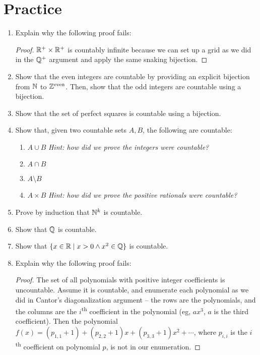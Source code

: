 \documentclass[main.tex]{subfiles}
\begin{document}
\section{Practice}

\begin{enumerate}
	\item
	Explain why the following proof fails:
	\begin{proof}
		\(\mathbb{R}^{+} \times \mathbb{R}^{+}\) is countably infinite because we can set up a grid as we did in the \(\mathbb{Q}^{+}\) argument and apply the same snaking bijection. \mbox{}
	\end{proof}
	\item
	Show that the even integers are countable by providing an explicit bijection from \(\mathbb{N}\) to \(\mathbb{Z}^{\text{even}}\).
	Then, show that the odd integers are countable using a bijection.
	\item
	Show that the set of perfect squares is countable using a bijection.
	\item
	Show that, given two countable sets \(A,B\), the following are countable:
	\begin{enumerate}
		\item \(A \cup B\) \textit{Hint: how did we prove the integers were countable?}
		\item \(A \cap B\)
		\item \(A \setminus B\)
		\item \(A \times B\) \textit{Hint: how did we prove the positive rationals were countable?}
	\end{enumerate}
	\item
	Prove by induction that \(\mathbb{N}^k\) is countable.
	\item Show that \(\mathbb{Q}\) is countable.
	\item Show that \(\{ x \in \mathbb{R} \mid x > 0 \land x^2 \in \mathbb{Q} \}\) is countable.
	\item Explain why the following proof fails:
	\begin{proof}
		The set of all polynomials with positive integer coefficients is uncountable. Assume it is countable, and enumerate each polynomial as we did in Cantor's diagonalization argument -- the rows are the polynomials, and the columns are the \(i\)\textsuperscript{th} coefficient in the polynomial (eg, \(ax^3\), \(a\) is the third coefficient). Then the polynomial \(f(x) = (p_{1,1}+1) + (p_{2,2}+1)x + (p_{3,3}+1)x^2 + \cdots\), where \(p_{i,i}\) is the \(i\)\textsuperscript{th} coefficient on polynomial \(p\), is not in our enumeration.
	\end{proof}

\end{enumerate}
\end{document}
